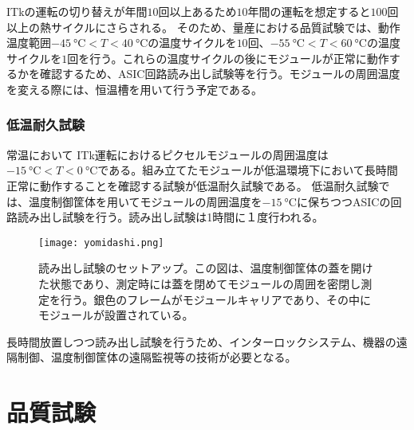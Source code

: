 ITkの運転の切り替えが年間$10$回以上あるため$10$年間の運転を想定すると$100$回以上の熱サイクルにさらされる。
そのため、量産における品質試験では、動作温度範囲$-45\ \si{\degreeCelsius}<T<40\ \si{\degreeCelsius}$の温度サイクルを$10$回、$-55\ \si{\degreeCelsius}<T<60\ \si{\degreeCelsius}$の温度サイクルを$1$回を行う。これらの温度サイクルの後にモジュールが正常に動作するかを確認するため、ASIC回路読み出し試験等を行う。モジュールの周囲温度を変える際には、恒温槽を用いて行う予定である。

\subsubsection*{低温耐久試験}

常温において
ITk運転におけるピクセルモジュールの周囲温度は$-15\ \si{\degreeCelsius}<T<0\ \si{\degreeCelsius}$である。組み立てたモジュールが低温環境下において長時間正常に動作することを確認する試験が低温耐久試験である。
低温耐久試験では、温度制御筐体を用いてモジュールの周囲温度を$-15\ \si{\degreeCelsius}$に保ちつつASICの回路読み出し試験を行う。読み出し試験は1時間に１度行われる。
\begin{figure}[tbp]
  \centering
  \texttt{[image: yomidashi.png]}
  \caption[読み出し試験のセットアップ]{読み出し試験のセットアップ。この図は、温度制御筐体の蓋を開けた状態であり、測定時には蓋を閉めてモジュールの周囲を密閉し測定を行う。銀色のフレームがモジュールキャリアであり、その中にモジュールが設置されている。}
  \label{fig:yomidashi}
\end{figure}

長時間放置しつつ読み出し試験を行うため、インターロックシステム、機器の遠隔制御、温度制御筐体の遠隔監視等の技術が必要となる。

\section{品質試験}
\label{sec:QCtest}

